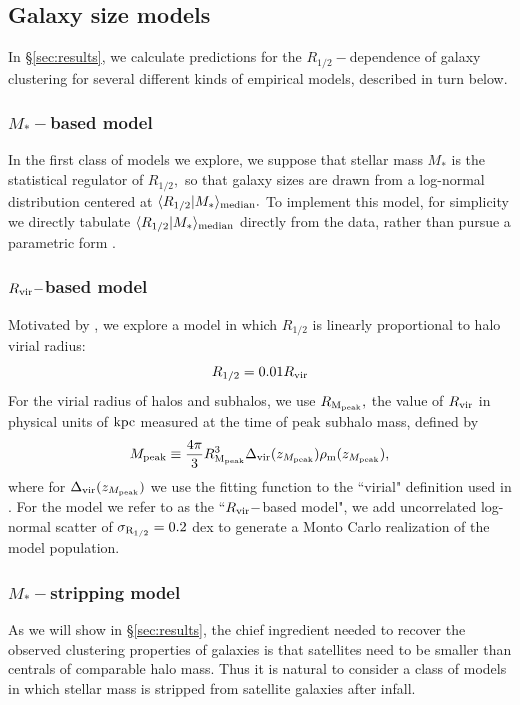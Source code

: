 \documentclass[usenatbib,usegraphicx,letterpaper]{mn2e}
\newcommand{\beq}{\begin{equation}}
\newcommand{\eeq}{\end{equation}}
\newcommand{\rhalf}{R_{1/2}}
\newcommand{\sigmarhalf}{\sigma_{\rm R_{1/2}}}
\newcommand{\mstar}{M_{\ast}}
\newcommand{\mpeak}{M_{\rm peak}}
\newcommand{\zpeak}{z_{M_{\rm peak}}}
\newcommand{\rvir}{R_{\rm vir}}
\newcommand{\rmpeak}{R_{\rm M_{peak}}}
\newcommand{\median}[2]{\langle{#1}\vert{#2}\rangle_{\rm median}}
\newcommand{\kpc}{{\rm kpc}}
\begin{document}
\subsection{Galaxy size models}
\label{subsec:model}

In \S\ref{sec:results}, we calculate predictions for the $\rhalf-$dependence of galaxy clustering for several different kinds of empirical models, described in turn below.

\subsubsection{$\mstar-$based model}
\label{subsubsec:mstaronlymodel}

In the first class of models we explore, we suppose that stellar mass $\mstar$ is the statistical regulator of $\rhalf,$ so that galaxy sizes are drawn from a log-normal distribution centered at $\median{\rhalf}{\mstar}.$ To implement this model, for simplicity we directly tabulate $\median{\rhalf}{\mstar}$ directly from the data, rather than pursue a parametric form \citep[see, e.g.,][]{zhang_yang17}.

\subsubsection{$\rvir-$based model}
\label{subsubsec:rvirmodel}

Motivated by \citet{kravtsov13}, we explore a model in which $\rhalf$ is linearly proportional to halo virial radius:
\beq
\label{eq:fiducial_model}
\rhalf = 0.01\rvir
\eeq
For the virial radius of halos and subhalos, we use $\rmpeak,$ the value of $\rvir$ in physical units of $\kpc$ measured at the time of peak subhalo mass, defined by
\beq
\mpeak\equiv\frac{4\pi}{3}\rmpeak^{3}\Delta_{\rm vir}(\zpeak)\rho_{\rm m}(\zpeak),
\eeq
where for $\Delta_{\rm vir}(\zpeak)$ we use the fitting function to the ``virial" definition used in \citet{bryan_norman98}. For the model we refer to as the ``$\rvir-$based model", we add uncorrelated log-normal scatter of $\sigmarhalf=0.2$ dex to generate a Monto Carlo realization of the model population.

\subsubsection{$\mstar-$stripping model}
\label{subsubsec:strippingmodel}

As we will show in \S\ref{sec:results}, the chief ingredient needed to recover the observed clustering properties of galaxies is that satellites need to be smaller than centrals of comparable halo mass. Thus it is natural to consider a class of models in which stellar mass is stripped from satellite galaxies after infall.
\end{document}
